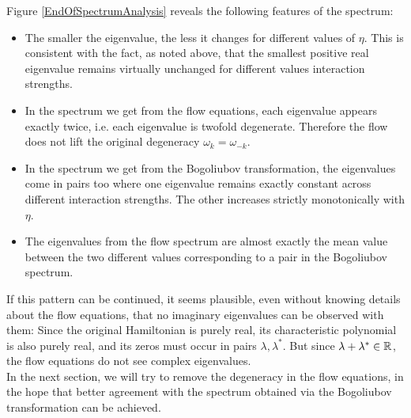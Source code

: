 Figure \ref{EndOfSpectrumAnalysis} reveals the following features of the spectrum:
\begin{itemize}
\item The smaller the eigenvalue, the less it changes for different values of $\eta$. This is consistent with the fact, as noted above, that the smallest positive real eigenvalue remains virtually unchanged for different values interaction strengths.
\item In the spectrum we get from the flow equations, each eigenvalue appears exactly twice, i.e. each eigenvalue is twofold degenerate. Therefore the flow does not lift the original degeneracy $\omega_k=\omega_{-k}$.
\item In the spectrum we get from the Bogoliubov transformation, the eigenvalues come in pairs too where one eigenvalue remains exactly constant across different interaction strengths. The other increases strictly monotonically with $\eta$.
\item The eigenvalues from the flow spectrum are almost exactly the mean value between the two different values corresponding to a pair in the Bogoliubov spectrum.
\end{itemize}
If this pattern can be continued, it seems plausible, even without knowing details about the flow equations, that no imaginary eigenvalues can be observed with them: Since the original Hamiltonian is purely real, its characteristic polynomial is also purely real, and its zeros must occur in pairs $\lambda,\lambda^*$. But since $\lambda+\lambda^*\in\mathbb{R}$, the flow equations do not see complex eigenvalues.\\
In the next section, we will try to remove the degeneracy in the flow equations, in the hope that better agreement with the spectrum obtained via the Bogoliubov transformation can be achieved.
